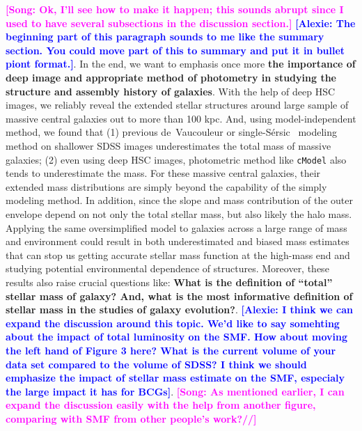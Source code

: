 \documentclass{emulateapj}
\def\ser{{S\'{e}rsic\ }}
\def\cmodel{\texttt{cModel}}
\newcommand{\song}[1]{\textcolor{magenta}{\textbf{[Song: #1]}}}
\newcommand{\alexie}[1]{\textcolor{blue}{\textbf{[Alexie: #1]}}}
\begin{document}
\begin{CJK*}{UTF8}{gbsn}
    \song{Ok, I'll see how to make it happen; this sounds abrupt since I used 
    to have several subsections in the discussion section.}
    \alexie{The beginning part of this paragraph sounds to me like the summary section. You could move part of this to summary and put it in bullet piont format.}. In the end, we want to emphasis once more \textbf{the importance of deep image 
    and appropriate method of photometry in studying the structure and assembly 
    history of galaxies}. 
    With the help of deep HSC images, we reliably reveal the extended stellar 
    structures around large sample of massive central galaxies out to more than 
    100 kpc.  
    And, using model-independent method, we found that 
    (1) previous de~Vaucouleur or single-\ser{} modeling method on shallower SDSS
    images underestimates the total mass of massive galaxies; 
    (2) even using deep HSC images, photometric method like \cmodel{} also tends 
    to underestimate the mass. 
    For these massive central galaxies, their extended mass distributions are 
    simply beyond the capability of the simply modeling method.  
    In addition, since the slope and mass contribution of the outer envelope 
    depend on not only the total stellar mass, but also likely the halo mass. 
    Applying the same oversimplified model to galaxies across a large range of 
    mass and environment could result in both underestimated and biased mass 
    estimates that can stop us getting accurate stellar mass function at the 
    high-mass end and studying potential environmental dependence of structures. 
    Moreover, these results also raise crucial questions like: 
    \textbf{What is the definition of ``total'' stellar mass of galaxy? 
    And, what is the most informative definition of stellar mass in the studies 
    of galaxy evolution?}.  \alexie{I think we can expand the discussion around this topic. We'd like to say somehting about the impact of total luminosity on the SMF. How about moving the left hand of Figure 3 here? What is the current volume of your data set compared to the volume of SDSS? I think we should emphasize the impact of stellar mass estimate on the SMF, especialy the large impact it has for BCGs}.
    \song{As mentioned earlier, I can expand the discussion easily with the help 
    from another figure, comparing with SMF from other people's work?//}
    

\end{CJK*}
\end{document}
